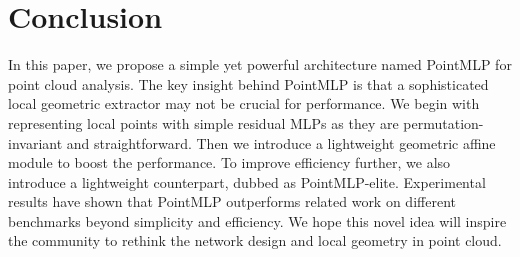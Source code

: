 \section{Conclusion}
In this paper, we propose a simple yet powerful architecture named PointMLP for point cloud analysis. The key insight behind PointMLP is that a sophisticated local geometric extractor may not be crucial for performance. We begin with representing local points with simple residual MLPs as they are permutation-invariant and straightforward. Then we introduce a lightweight geometric affine module to boost the performance. To improve efficiency further, we also introduce a lightweight counterpart, dubbed as PointMLP-elite. Experimental results have shown that PointMLP outperforms related work on different benchmarks beyond simplicity and efficiency. We hope this novel idea will inspire the community to rethink the network design and local geometry in point cloud.

\newpage

\newpage

